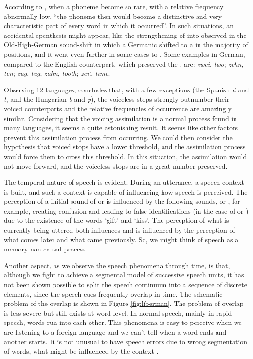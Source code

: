 According to \cite{zipf1949}, when a phoneme become so rare, with a relative frequency abnormally low, ``the phoneme then would become a distinctive and very characteristic part of every word in which it occurred''. In such situations, an accidental epenthesis might appear, like the strengthening of \textipa{[t]} into \textipa{[ts]} observed in the Old-High-German sound-shift in which a Germanic \textipa{[t]} shifted to a \textipa{[ts]} in the majority of positions, and it went even further in some cases to \textipa{[ss]}. Some examples in German, compared to the English counterpart, which preserved the \textipa{[t]}, are: \textit{zwei}, \textit{two}; \textit{zehn}, \textit{ten}; \textit{zug}, \textit{tug}; \textit{zahn}, \textit{tooth}; \textit{zeit}, \textit{time}.

Observing 12 languages, \cite{zipf1949} concludes that, with a few exceptions 
(the Spanish \textit{d} and \textit{t}, and the Hungarian \textit{b} and \textit{p}), 
the voiceless stops strongly outnumber their voiced counterparts and the relative frequencies 
of occurrence are amazingly similar. Considering that the voicing assimilation is a normal 
process found in many languages, it seems a quite astonishing result. It seems like other factors 
prevent this assimilation process from occurring. We could then consider the hypothesis that voiced 
stops have a lower threshold, and the assimilation process would force them to cross this threshold. 
In this situation, the assimilation would not move forward, and the voiceless stops are in a great number 
preserved.

The temporal nature of speech is evident. During an utterance, a speech context is built, and such a context is capable of influencing how speech is perceived. The perception of a initial sound of \textipa{[k]} or \textipa{[g]} is influenced by the following sounds, \textipa{[Is]} or \textipa{[Ift]}, for example, creating confusion and leading to false identifications (in the case of \textipa{[kIft]} or \textipa{[gIs]}) due to the existence of the words `gift' and `kiss'. The perception of what is currently being uttered both influences and is influenced by the perception of what comes later and what came previously. So, we might think of speech as a memory non-causal process.

Another aspect, as we observe the speech phenomena through time, is that, although we fight to achieve a segmental model of successive speech units, it has not been shown possible to split the speech continuum into a sequence of discrete elements, since the speech cues frequently overlap in time. The schematic problem of the overlap is shown in Figure \ref{fig:liberman}. The problem of overlap is less severe but still exists at word level. In normal speech, mainly in rapid speech, words run into each other. This phenomena is easy to perceive when we are listening to a foreign language and we can't tell when a word ends and another starts. It is not unusual to have speech errors due to wrong segmentation of words, what might be influenced by the context \citep{bondgarnes,cole1980}.

